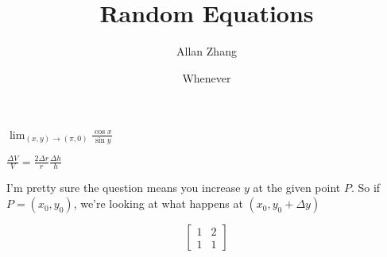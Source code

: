 \documentclass[hidelinks]{article}
\title{\textbf{Random Equations}}
\author{Allan Zhang}
\date{Whenever}
\begin{document}
\hypersetup{bookmarksnumbered=true,}
\pagecolor{white}
\color{black}
\maketitle


$\lim_{(x, y)\to(\pi, 0)}{\frac{\cos x}{\sin y}}$

$\frac{\Delta V}{V} = \frac{2 \Delta r}{r}\frac{\Delta h}{h}$

I'm pretty sure the question means you increase $y$ at the given point $P$. So if $P = (x_0, y_0)$, we're looking at what happens at $(x_0, y_0 + \Delta y)$ 


\[\begin{bmatrix} 
1 & 2 \\ 1 & 1 
\end{bmatrix}
\]
\end{document}
